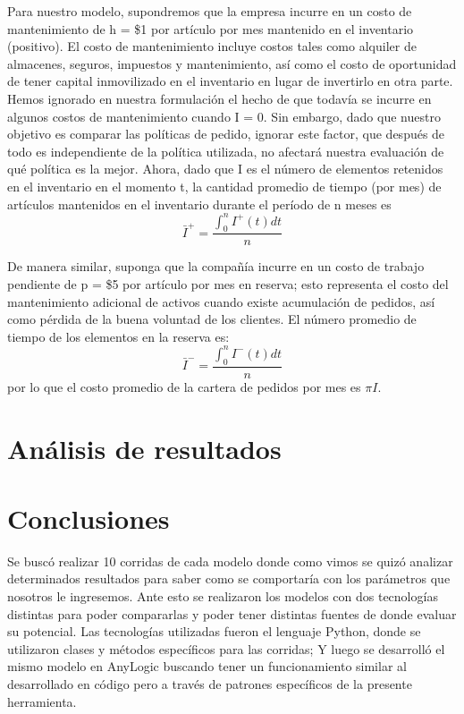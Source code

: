 Para nuestro modelo, supondremos que la empresa incurre en un costo de mantenimiento de
h = \$1 por artículo por mes mantenido en el inventario (positivo).
El costo de mantenimiento incluye costos tales como alquiler de almacenes, seguros, impuestos
y mantenimiento, así como el costo de oportunidad de tener capital inmovilizado en el inventario
en lugar de invertirlo en otra parte.
Hemos ignorado en nuestra formulación el hecho de que todavía se incurre en algunos costos de
mantenimiento cuando I = 0.
Sin embargo, dado que nuestro objetivo es comparar las políticas de pedido, ignorar este factor,
que después de todo es independiente de la política utilizada, no afectará nuestra evaluación
de qué política es la mejor.
Ahora, dado que I es el número de elementos retenidos en el inventario en el momento t,
la cantidad promedio de tiempo (por mes) de artículos mantenidos en el inventario durante el
período de n meses es
\begin{equation}
  \label{eq:equation11}
  \bar{I}^{+}=\frac{\int_{0}^{n}I^{+}(t)dt}{n}
\end{equation}

De manera similar, suponga que la compañía incurre en un costo de trabajo pendiente de p = \$5 por
artículo por mes en reserva;
esto representa el costo del mantenimiento adicional de activos cuando existe acumulación de pedidos,
así como pérdida de la buena voluntad de los clientes.
El número promedio de tiempo de los elementos en la reserva es:
\begin{equation}
    \label{eq:equation12}
    \bar{I}^{-}=\frac{\int_{0}^{n}I^{-}(t)dt}{n}
\end{equation}
por lo que el costo promedio de la cartera de pedidos por mes es $\pi I$.


\section{Análisis de resultados}
    
    
    


\section{Conclusiones}
\label{sec:conclusiones}
Se buscó realizar 10 corridas de cada modelo donde como vimos se quizó analizar determinados resultados para saber como se comportaría con los parámetros que nosotros le ingresemos.
Ante esto se realizaron los modelos con dos tecnologías distintas para poder compararlas y poder tener distintas fuentes de donde evaluar su potencial.
Las tecnologías utilizadas fueron el lenguaje Python, donde se utilizaron clases y métodos específicos para las corridas;
Y luego se desarrolló el mismo modelo en AnyLogic buscando tener un funcionamiento similar al desarrollado en código pero a través de patrones específicos de la presente herramienta.

